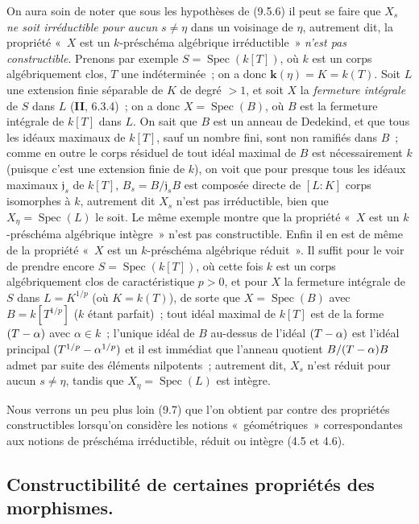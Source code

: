 \begin{remark}[9.5.7]
\label{IV.9.5.7-fr}
On aura soin de noter que sous les hypothèses de (9.5.6) il peut se faire que
$X_s$ \emph{ne soit irréductible pour aucun} $s\neq\eta$ dans un voisinage de
$\eta$, autrement dit, la propriété «~$X$ est un $k$-préschéma algébrique
irréductible~» \emph{n'est pas constructible}. Prenons par exemple
$S=\operatorname{Spec}(k[T])$, où $k$ est un corps algébriquement clos, $T$ une
indéterminée~; on a donc $\boldsymbol{k}(\eta)=K=k(T)$. Soit $L$ une extension finie
séparable de $K$ de degré $>1$, et soit $X$ la \emph{fermeture intégrale} de
$S$ dans $L$ (\textbf{II}, 6.3.4)~; on a donc $X=\operatorname{Spec}(B)$, où
$B$ est la fermeture intégrale de $k[T]$ dans $L$. On sait que $B$ est un
anneau de Dedekind, et que tous les idéaux maximaux de $k[T]$, sauf un nombre
fini, sont non ramifiés dans $B$~; comme en outre le corps résiduel de tout
idéal maximal de $B$ est nécessairement $k$ (puisque c'est une extension finie
de $k$), on voit que pour presque tous les idéaux maximaux $\mathfrak j_s$ de
$k[T]$, $B_s=B/\mathfrak j_sB$ est composée directe de $[L:K]$ corps isomorphes
à $k$, autrement dit $X_s$ n'est pas irréductible, bien que
$X_\eta=\operatorname{Spec}(L)$ le soit. Le même exemple montre que la
propriété «~$X$ est un $k$-préschéma algébrique intègre~» n'est pas
constructible. Enfin il en est de même de la propriété «~$X$ est un
$k$-préschéma algébrique réduit~». Il suffit pour le voir de prendre encore
$S=\operatorname{Spec}(k[T])$, où cette fois $k$ est un corps algébriquement
clos de caractéristique $p>0$, et pour $X$ la fermeture intégrale de $S$ dans
$L=K^{1/p}$ (où $K=k(T)$), de sorte que $X=\operatorname{Spec}(B)$ avec
$B=k[T^{1/p}]$ ($k$ étant parfait)~; tout idéal maximal de $k[T]$ est de la
forme $(T-\alpha)$ avec $\alpha\in k$~; l'unique idéal de $B$ au-dessus de
l'idéal $(T-\alpha)$ est l'idéal principal
$(T^{1/p}-\alpha^{1/p})$ et il est immédiat
que l'anneau quotient $B/(T-\alpha)B$ admet par suite des éléments nilpotents~;
autrement dit, $X_s$ n'est réduit pour aucun $s\neq\eta$, tandis que
$X_\eta=\operatorname{Spec}(L)$ est intègre.

Nous verrons un peu plus loin (9.7) que l'on obtient par contre des propriétés
constructibles lorsqu'on considère les notions «~géométriques~»
correspondantes aux notions de préschéma irréductible, réduit ou intègre (4.5
et 4.6).
\end{remark}

\subsection{Constructibilité de certaines propriétés des morphismes.}
\label{subsection:IV.9.6-fr}

